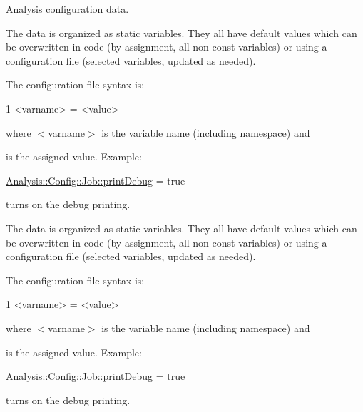 \hyperlink{namespaceAnalysis}{Analysis} configuration data.

The data is organized as static variables. They all have default values which can be overwritten in code (by assignment, all non-\/const variables) or using a configuration file (selected variables, updated as needed).

The configuration file syntax is\+: 
\begin{DoxyCode}
1 <varname> = <value>
\end{DoxyCode}
 where {\ttfamily } $<$varname$>$ is the variable name (including namespace) and {\ttfamily } 

is the assigned value. Example\+: 
\begin{DoxyCode}
\hyperlink{namespaceAnalysis_1_1Config_1_1Job_aabd902531ff651c92a08fa9f986e2046}{Analysis::Config::Job::printDebug} = \textcolor{keyword}{true} 
\end{DoxyCode}
 turns on the debug printing.

The data is organized as static variables. They all have default values which can be overwritten in code (by assignment, all non-\/const variables) or using a configuration file (selected variables, updated as needed).

The configuration file syntax is\+: 
\begin{DoxyCode}
1 <varname> = <value>
\end{DoxyCode}
 where {\ttfamily } $<$varname$>$ is the variable name (including namespace) and {\ttfamily } 

is the assigned value. Example\+: 
\begin{DoxyCode}
\hyperlink{namespaceAnalysis_1_1Config_1_1Job_aabd902531ff651c92a08fa9f986e2046}{Analysis::Config::Job::printDebug} = \textcolor{keyword}{true} 
\end{DoxyCode}
 turns on the debug printing.